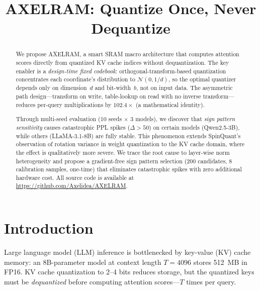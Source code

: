 \documentclass[conference]{IEEEtran}
\begin{document}
\title{AXELRAM: Quantize Once, Never Dequantize}

\author{
}

\maketitle

\begin{abstract}
We propose AXELRAM, a smart SRAM macro architecture that computes attention scores directly from quantized KV cache indices without dequantization.
The key enabler is a \emph{design-time fixed codebook}: orthogonal-transform-based quantization concentrates each coordinate's distribution to $\mathcal{N}(0,1/d)$, so the optimal quantizer depends only on dimension~$d$ and bit-width~$b$, not on input data.
The asymmetric path design---transform on write, table-lookup on read with no inverse transform---reduces per-query multiplications by $102.4\times$ (a mathematical identity).

Through multi-seed evaluation (10 seeds $\times$ 3 models), we discover that \emph{sign pattern sensitivity} causes catastrophic PPL spikes ($\Delta > 50$) on certain models (Qwen2.5-3B), while others (LLaMA-3.1-8B) are fully stable.
This phenomenon extends SpinQuant's observation of rotation variance in weight quantization to the KV cache domain, where the effect is qualitatively more severe.
We trace the root cause to layer-wise norm heterogeneity and propose a gradient-free sign pattern selection (200 candidates, 8 calibration samples, one-time) that eliminates catastrophic spikes with zero additional hardware cost.
All source code is available at \url{https://github.com/Axelidea/AXELRAM}.
\end{abstract}

\section{Introduction}

Large language model (LLM) inference is bottlenecked by key-value (KV) cache memory: an 8B-parameter model at context length $T{=}4096$ stores 512~MB in FP16.
KV cache quantization to 2--4 bits reduces storage, but the quantized keys must be \emph{dequantized} before computing attention scores---$T$ times per query.
\end{document}
